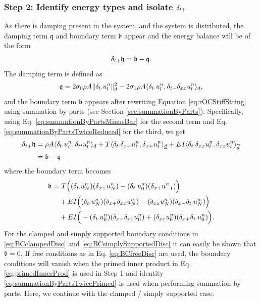 {\subsubsection{Step 2: Identify energy types and isolate $\delta_{t+}$}
As there is damping present in the system, and the system is distributed, the damping term $\mathfrak{q}$ and boundary term $\mathfrak{b}$ appear and the energy balance will be of the form 
\begin{equation}
    \delta_{t+} \mathfrak{h} = \mathfrak{b}-\mathfrak{q}.
\end{equation}
The damping term is defined as 
\begin{equation}\label{eq:dampingTermStiffString}
    \mathfrak{q} = 2\sigma_{0} \rho A \lVert\delta_{t\cdot}u_l^n\rVert_d^2 - 2 \sigma_{1} \rho A \langle \delta_{t\cdot} u_l^n, \delta_{t-} \delta_{xx} u_l^n \rangle_d,
\end{equation}
and the boundary term $\mathfrak{b}$ appears after rewriting Equation \eqref{eq:rOCStiffString} using summation by parts (see Section \ref{sec:summationByParts}). Specifically, using Eq. \eqref{eq:summationByPartsMinusBar} for the second term and Eq. \eqref{eq:summationByPartsTwiceReduced} for the third, we get
\begin{align*}
    \delta_{t+} \mathfrak{h} &= \rho A \langle \delta_{t\cdot} u_l^n, \delta_{tt} u_l^n \rangle_d + T \langle \delta_{t\cdot} \delta_{x+} u_l^n, \delta_{x+} u_l^n\rangle_{\underline{d}} + EI \langle \delta_{t\cdot} \delta_{xx} u_l^n, \delta_{xx} u_l^n \rangle_{\overline{\underline{d}}} \\
    &= \mathfrak{b} - \mathfrak{q}
\end{align*}
where the boundary term becomes
\begin{align*}
    \mathfrak{b} =&\ T\Big((\delta_{t\cdot} u_N^n)(\delta_{x+} u_N^n) - (\delta_{t\cdot} u_0^n) (\delta_{x+} u_{-1}^n)\Big) \\
    &+ EI \Big((\delta_{t\cdot} u_N^n)(\delta_{x+} \delta_{xx} u_N^n) - (\delta_{xx} u_N^n)(\delta_{x-} \delta_{t\cdot} u_N^n) \Big)\\
    &+ EI \Big(- (\delta_{t\cdot} u_0^n)(\delta_{x-} \delta_{xx} u_0^n) + (\delta_{xx} u_0^n)(\delta_{x+} \delta_{t\cdot} u_0^n)\Big).
\end{align*}
For the clamped and simply supported boundary conditions in \eqref{eq:BCclampedDisc} and \eqref{eq:BCsimplySupportedDisc} it can easily be shown that $\mathfrak{b} = 0$. If free conditions as in Eq. \eqref{eq:BCfreeDisc} are used, the boundary conditions will vanish when the primed inner product in Eq. \eqref{eq:primedInnerProd} is used in Step 1 and identity \eqref{eq:summationByPartsTwicePrimed} is used when performing summation by parts. Here, we continue with the clamped / simply supported case. 

}
